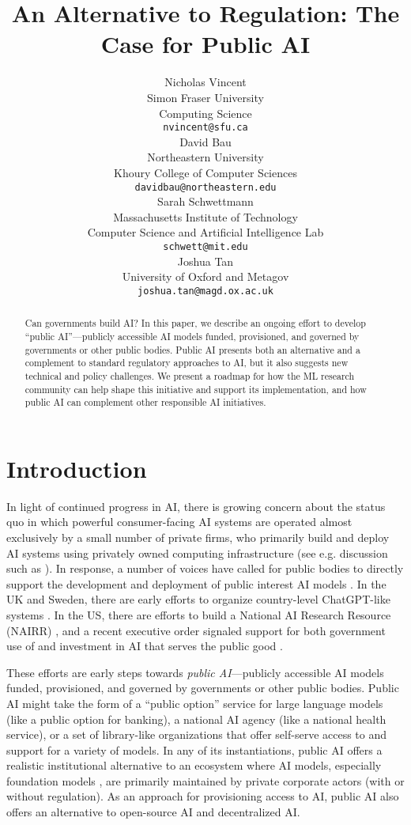 \documentclass{article}
\title{An Alternative to Regulation: The Case for Public AI}
\author{
Nicholas Vincent \\
Simon Fraser University \\
Computing Science \\
\texttt{nvincent@sfu.ca} \\
\And
David Bau \\
Northeastern University \\
Khoury College of Computer Sciences \\
\texttt{davidbau@northeastern.edu} \\
\And
Sarah Schwettmann \\
Massachusetts Institute of Technology \\
Computer Science and Artificial Intelligence Lab \\
\texttt{schwett@mit.edu} \\
\And
Joshua Tan \\
University of Oxford and Metagov \\
\texttt{joshua.tan@magd.ox.ac.uk} \\
}
\begin{document}
\maketitle

\begin{abstract}
Can governments build AI? In this paper, we describe an ongoing effort to develop ``public AI''---publicly accessible AI models funded, provisioned, and governed by governments or other public bodies. Public AI presents both an alternative and a complement to standard regulatory approaches to AI, but it also suggests new technical and policy challenges. We present a roadmap for how the ML research community can help shape this initiative and support its implementation, and how public AI can complement other responsible AI initiatives.
\end{abstract}

\section{Introduction}
In light of continued progress in AI, there is growing concern about the status quo in which powerful consumer-facing AI systems are operated almost exclusively by a small number of private firms, who primarily build and deploy AI systems using privately owned computing infrastructure (see e.g. discussion such as \cite{vincentAIEnteringEra2023,widderOpenBusinessBig2023,sadowski_everyone_2021}).
In response, a number of voices have called for public bodies to directly support the development and deployment of public interest AI models \cite{jenningsOpinionThereOnly2023,schneierHowArtificialIntelligence2023,sandersBuildAIPeople2023}. In the UK and Sweden, there are early efforts to organize country-level ChatGPT-like systems \cite{belfieldGreatBritishCloud2023, ukparliamentGovernanceArtificialIntelligence2023,AISwedenAdvancing2023}. In the US, there are efforts to build a National AI Research Resource (NAIRR) \cite{lynchNewReportDetails2023}, and a recent executive order signaled support for both government use of and investment in AI that serves the public good \cite{thewhitehouseFACTSHEETPresident2023}.

These efforts are early steps towards \emph{public AI}---publicly accessible AI models funded, provisioned, and governed by governments or other public bodies. 
Public AI might take the form of a ``public option'' service for large language models (like a public option for banking), a national AI agency (like a national health service), or a set of library-like organizations that offer self-serve access to and support for a variety of models.
In any of its instantiations, public AI offers a realistic institutional alternative to an ecosystem where AI models, especially foundation models \cite{bommasani2021opportunities}, are primarily maintained by private corporate actors (with or without regulation). As an approach for provisioning access to AI, public AI also offers an alternative to open-source AI and decentralized AI. 
\end{document}
